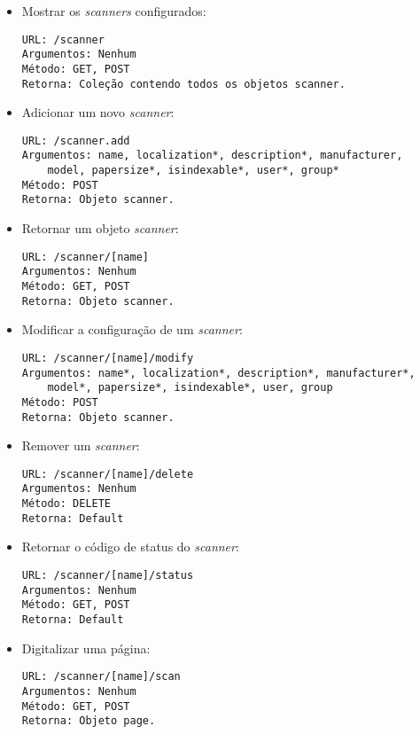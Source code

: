 \begin{itemize}

\item Mostrar os {\it scanners} configurados:
\begin{verbatim}
URL: /scanner
Argumentos: Nenhum
Método: GET, POST
Retorna: Coleção contendo todos os objetos scanner.
\end{verbatim}

\item Adicionar um novo {\it scanner}:
\begin{verbatim}
URL: /scanner.add
Argumentos: name, localization*, description*, manufacturer, 
    model, papersize*, isindexable*, user*, group*
Método: POST
Retorna: Objeto scanner.
\end{verbatim}

\item Retornar um objeto {\it scanner}:
\begin{verbatim}
URL: /scanner/[name]
Argumentos: Nenhum
Método: GET, POST
Retorna: Objeto scanner.
\end{verbatim}

\item Modificar a configuração de um {\it scanner}:
\begin{verbatim}
URL: /scanner/[name]/modify
Argumentos: name*, localization*, description*, manufacturer*, 
    model*, papersize*, isindexable*, user, group
Método: POST
Retorna: Objeto scanner.
\end{verbatim}

\item Remover um {\it scanner}:
\begin{verbatim}
URL: /scanner/[name]/delete
Argumentos: Nenhum
Método: DELETE
Retorna: Default
\end{verbatim}

\item Retornar o código de status do {\it scanner}:
\begin{verbatim}
URL: /scanner/[name]/status
Argumentos: Nenhum
Método: GET, POST
Retorna: Default
\end{verbatim}

\item Digitalizar uma página:
\begin{verbatim}
URL: /scanner/[name]/scan
Argumentos: Nenhum
Método: GET, POST
Retorna: Objeto page.
\end{verbatim}

\end{itemize}

